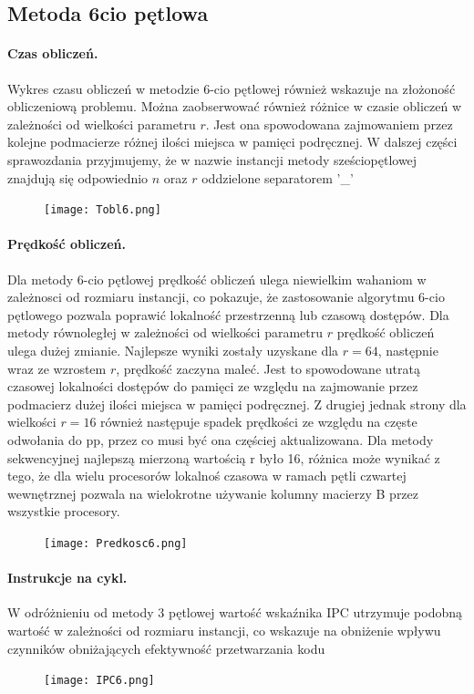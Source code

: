 \documentclass{scrartcl}
\begin{document}
\subsection{Metoda 6cio pętlowa}

\paragraph{Czas obliczeń.} Wykres czasu obliczeń w metodzie 6-cio pętlowej również wskazuje na złożoność obliczeniową problemu. Można zaobserwować również różnice w czasie obliczeń w zależności od wielkości parametru $r$. Jest ona spowodowana zajmowaniem przez kolejne podmacierze różnej ilości miejsca w pamięci podręcznej. W dalszej części sprawozdania przyjmujemy, że w nazwie instancji metody sześciopętlowej znajdują się odpowiednio $n$ oraz $r$ oddzielone separatorem '\_'
\begin{figure}[H]
\texttt{[image: Tobl6.png]}
\end{figure}

\paragraph{Prędkość obliczeń.} Dla metody 6-cio pętlowej prędkość obliczeń ulega niewielkim wahaniom w zależnosci od rozmiaru instancji, co pokazuje, że zastosowanie algorytmu 6-cio pętlowego pozwala poprawić lokalność przestrzenną lub czasową dostępów. Dla metody równoległej w zależności od wielkości parametru $r$ prędkość obliczeń ulega dużej zmianie. Najlepsze wyniki zostały uzyskane dla $r = 64$, następnie wraz ze wzrostem $r$, prędkość zaczyna maleć. Jest to spowodowane utratą czasowej lokalności dostępów do pamięci ze względu na zajmowanie przez podmacierz dużej ilości miejsca w pamięci podręcznej. Z drugiej jednak strony dla wielkości $r = 16$ również następuje spadek prędkości ze względu na częste odwołania do pp, przez co musi być ona częściej aktualizowana. Dla metody sekwencyjnej najlepszą mierzoną wartością r było 16, różnica może wynikać z tego, że dla wielu procesorów lokalnoś czasowa w ramach pętli czwartej wewnętrznej pozwala na wielokrotne używanie kolumny macierzy B przez wszystkie procesory.
\begin{figure}[H]
\texttt{[image: Predkosc6.png]}\\
\end{figure}

\paragraph{Instrukcje na cykl.} W odróżnieniu od metody 3 pętlowej wartość wskaźnika IPC utrzymuje podobną wartość w zależności od rozmiaru instancji, co wskazuje na obniżenie wpływu czynników obniżających efektywność przetwarzania kodu
\begin{figure}[H]
\texttt{[image: IPC6.png]}\\
\end{figure}
\end{document}
